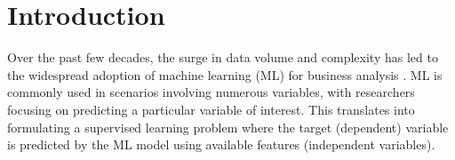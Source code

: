 \documentclass[mnsc,blindrev]{informs3}
\begin{document}
\section{Introduction}

Over the past few decades, the surge in data volume and complexity has led to the widespread adoption of machine learning (ML) for business analysis \citep{kleinberg2015prediction,mullainathan17applied}. ML is commonly used in scenarios involving numerous variables, with researchers focusing on predicting a particular variable of interest. This translates into formulating a supervised learning problem where the target (dependent) variable is predicted by the ML model using available features (independent variables).
\end{document}
